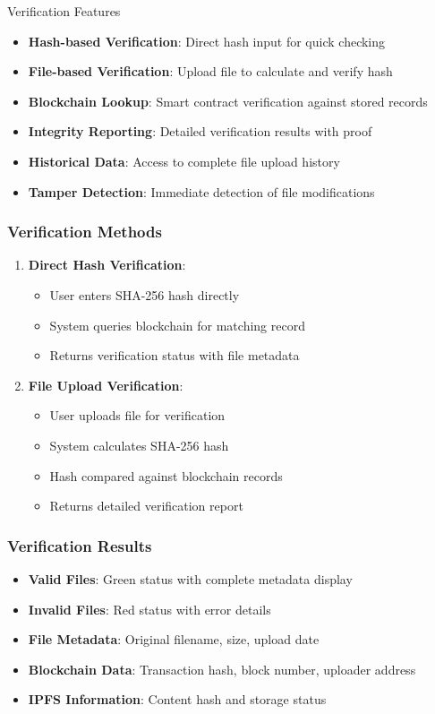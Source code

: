\documentclass[11pt,a4paper]{article}
\begin{document}
\begin{featurebox}{\faCheckCircle\space Verification Features}
\begin{itemize}
    \item \textbf{Hash-based Verification}: Direct hash input for quick checking
    \item \textbf{File-based Verification}: Upload file to calculate and verify hash
    \item \textbf{Blockchain Lookup}: Smart contract verification against stored records
    \item \textbf{Integrity Reporting}: Detailed verification results with proof
    \item \textbf{Historical Data}: Access to complete file upload history
    \item \textbf{Tamper Detection}: Immediate detection of file modifications
\end{itemize}
\end{featurebox}

\subsubsection{Verification Methods}
\begin{enumerate}
    \item \textbf{Direct Hash Verification}:
    \begin{itemize}
        \item User enters SHA-256 hash directly
        \item System queries blockchain for matching record
        \item Returns verification status with file metadata
    \end{itemize}
    \item \textbf{File Upload Verification}:
    \begin{itemize}
        \item User uploads file for verification
        \item System calculates SHA-256 hash
        \item Hash compared against blockchain records
        \item Returns detailed verification report
    \end{itemize}
\end{enumerate}

\subsubsection{Verification Results}
\begin{itemize}
    \item \textbf{Valid Files}: Green status with complete metadata display
    \item \textbf{Invalid Files}: Red status with error details
    \item \textbf{File Metadata}: Original filename, size, upload date
    \item \textbf{Blockchain Data}: Transaction hash, block number, uploader address
    \item \textbf{IPFS Information}: Content hash and storage status
\end{itemize}
\end{document}
